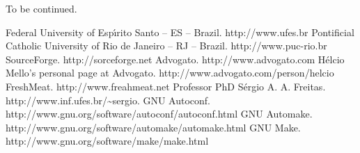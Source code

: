 \documentclass[a4paper,12pt]{book}
\begin{document}
To be continued.

\begin{thebibliography}{12}
 Federal University of Esp\'{\i}rito Santo -- ES -- Brazil.
http://www.ufes.br
 Pontificial Catholic University of Rio de Janeiro -- RJ
-- Brazil. http://www.puc-rio.br
 SourceForge. http://sorceforge.net
Advogato. http://www.advogato.com
H\'elcio Mello's personal page at Advogato.
http://www.advogato.com/person/helcio
FreshMeat. http://www.freahmeat.net
Professor PhD S\'ergio A. A. Freitas.
http://www.inf.ufes.br/\~{}sergio.
GNU Autoconf.
http://www.gnu.org/software/autoconf/autoconf.html
GNU Automake.
http://www.gnu.org/software/automake/automake.html
GNU Make. http://www.gnu.org/software/make/make.html
\end{thebibliography}
\end{document}

